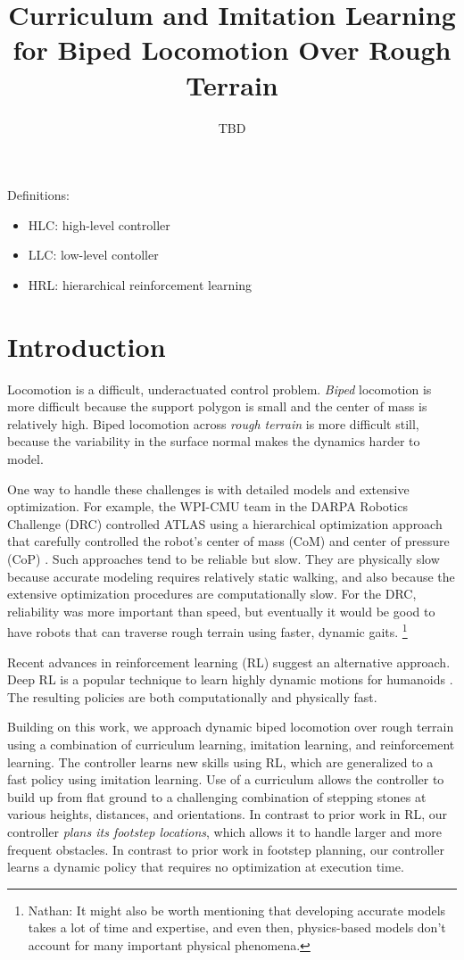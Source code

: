 \documentclass[a4paper]{article}
\title{Curriculum and Imitation Learning for Biped Locomotion Over Rough Terrain}
\author{TBD}
\newcommand{\nhatch}[1]{{\leavevmode\color{blue} Nathan: #1}}
\begin{document}
\maketitle

Definitions:
\begin{itemize}
  \item HLC: high-level controller
  \item LLC: low-level contoller
  \item HRL: hierarchical reinforcement learning
\end{itemize}

\section{Introduction}

Locomotion is a difficult, underactuated control problem. \emph{Biped} locomotion is more difficult because the support polygon is small and the center of mass is relatively high. Biped locomotion across \emph{rough terrain} is more difficult still, because the variability in the surface normal makes the dynamics harder to model.

One way to handle these challenges is with detailed models and extensive optimization. For example, the WPI-CMU team in the DARPA Robotics Challenge (DRC) controlled ATLAS using a hierarchical optimization approach that carefully controlled the robot's center of mass (CoM) and center of pressure (CoP) \citep{feng2015optimization}. Such approaches tend to be reliable but slow. They are physically slow because accurate modeling requires relatively static walking, and also because the extensive optimization procedures are computationally slow. For the DRC, reliability was more important than speed, but eventually it would be good to have robots that can traverse rough terrain using faster, dynamic gaits. \footnote{\nhatch{It might also be worth mentioning that developing accurate models takes a lot of time and expertise, and even then, physics-based models don't account for many important physical phenomena.}}

Recent advances in reinforcement learning (RL) suggest an alternative approach. Deep RL is a popular technique to learn highly dynamic motions for humanoids \citep{peng2018deepmimic, heess2017emergence}. The resulting policies are both computationally and physically fast.

Building on this work, we approach dynamic biped locomotion over rough terrain using a combination of curriculum learning, imitation learning, and reinforcement learning. The controller learns new skills using RL, which are generalized to a fast policy using imitation learning. Use of a curriculum allows the controller to build up from flat ground to a challenging combination of stepping stones at various heights, distances, and orientations. In contrast to prior work in RL, our controller \emph{plans its footstep locations}, which allows it to handle larger and more frequent obstacles. In contrast to prior work in footstep planning, our controller learns a dynamic policy that requires no optimization at execution time.
\end{document}
